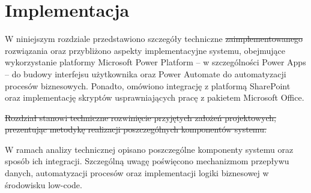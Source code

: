 \chapter{Implementacja}

W niniejszym rozdziale przedstawiono szczegóły techniczne \st{zaimplementowanego}  rozwiązania oraz przybliżono aspekty implementacyjne systemu, obejmujące wykorzystanie platformy Microsoft Power Platform -- w szczególności Power Apps -- do budowy interfejsu użytkownika oraz Power Automate do automatyzacji procesów biznesowych.
Ponadto, omówiono integrację z platformą SharePoint oraz implementację skryptów usprawniających pracę z pakietem Microsoft Office.

\st{Rozdział stanowi techniczne rozwinięcie przyjętych założeń projektowych, prezentując metodykę realizacji poszczególnych komponentów systemu.} 

W ramach analizy technicznej  opisano poszczególne komponenty systemu oraz sposób
ich integracji. Szczególną uwagę poświęcono mechanizmom przepływu danych, automatyzacji procesów oraz implementacji logiki biznesowej w środowisku low-code.





\begin{comment}
W niniejszym rozdziale przedstawiono szczegóły techniczne zaimplementowanego rozwiązania. Omówione zostaną kluczowe aspekty
implementacyjne systemu, obejmujące wykorzystanie platformy Microsoft Power Platform - w szczególności
Power Apps do budowy interfejsu użytkownika oraz Power Automate do automatyzacji procesów biznesowych.
Ponadto, przedstawiona zostanie integracja z platformą SharePoint oraz implementacja skryptów
usprawniających pracę z pakietem Microsoft Office. Rozdział stanowi techniczne rozwinięcie przyjętych
założeń projektowych, prezentując metodykę realizacji poszczególnych komponentów systemu.

W ramach analizy technicznej zostaną szczegółowo omówione poszczególne komponenty systemu oraz sposób
ich integracji. Szczególna uwaga zostanie poświęcona mechanizmom przepływu danych, automatyzacji
procesów oraz implementacji logiki biznesowej w środowisku low-code.

 \end{comment}